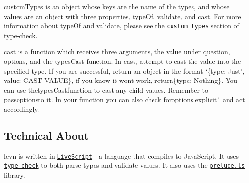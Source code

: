 {\ttfamily custom\+Types} is an object whose keys are the name of the types, and whose values are an object with three properties, {\ttfamily type\+Of}, {\ttfamily validate}, and {\ttfamily cast}. For more information about {\ttfamily type\+Of} and {\ttfamily validate}, please see the \href{https://github.com/gkz/type-check#custom-types}{\tt custom types} section of type-\/check.

{\ttfamily cast} is a function which receives three arguments, the value under question, options, and the types\+Cast function. In {\ttfamily cast}, attempt to cast the value into the specified type. If you are successful, return an object in the format `\{type\+: \textquotesingle{}Just', value\+: C\+A\+S\+T-\/\+V\+A\+L\+UE\}{\ttfamily , if you know it won\textquotesingle{}t work, return}\{type\+: \textquotesingle{}Nothing\textquotesingle{}\}{\ttfamily . You can use the}types\+Cast{\ttfamily function to cast any child values. Remember to pass}options{\ttfamily to it. In your function you can also check for}options.\+explicit\`{} and act accordingly.

\subsection*{Technical About}

{\ttfamily levn} is written in \href{http://livescript.net/}{\tt Live\+Script} -\/ a language that compiles to Java\+Script. It uses \href{https://github.com/gkz/type-check}{\tt type-\/check} to both parse types and validate values. It also uses the \href{http://preludels.com/}{\tt prelude.\+ls} library. 